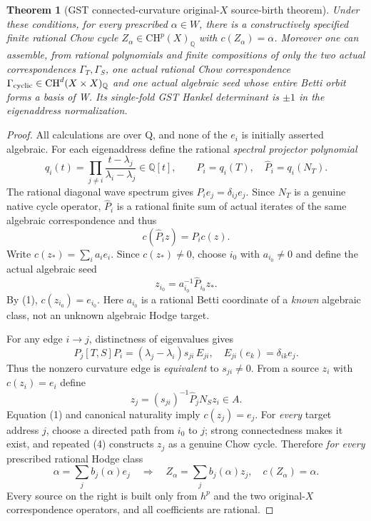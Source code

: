 \documentclass[11pt]{article}
\newtheorem{theorem}{Theorem}
\newcommand{\Q}{\mathbb Q}
\newcommand{\CH}{\mathrm{CH}}
\begin{document}
\begin{theorem}[GST connected-curvature original-$X$ source-birth theorem]
Under these conditions, for every prescribed $\alpha\in W$, there is a \emph{constructively specified finite} rational Chow cycle $Z_\alpha\in\CH^p(X)_\Q$ with $c(Z_\alpha)=\alpha$. Moreover one can assemble, from rational polynomials and finite compositions of only the two \emph{actual} correspondences $\Gamma_T,\Gamma_S$, one actual rational Chow correspondence $\Gamma_{\rm cyclic}\in\CH^d(X\times X)_\Q$ and one actual algebraic seed whose entire Betti orbit forms a basis of W. Its single-fold GST Hankel determinant is $\pm1$ in the eigenaddress normalization.
\end{theorem}
\begin{proof}
All calculations are over Q, and none of the $e_i$ is initially asserted algebraic. For each eigenaddress define the rational \emph{spectral projector polynomial}
\[
 q_i(t)=\prod_{j\ne i}\frac{t-\lambda_j}{\lambda_i-\lambda_j}\in\Q[t],
 \qquad P_i=q_i(T),\quad\widehat P_i=q_i(N_T).
\]
The rational diagonal wave spectrum gives $P_ie_j=\delta_{ij}e_j$. Since $N_T$ is a genuine native cycle operator, $\widehat P_i$ is a rational finite sum of actual iterates of the same algebraic correspondence and thus
\[
 \boxed{c(\widehat P_i z)=P_i c(z).}
 \tag{1}
\]
Write $c(z_*)=\sum_i a_ie_i$. Since $c(z_*)\ne0$, choose $i_0$ with $a_{i_0}\ne0$ and define the actual algebraic seed
\[
 \boxed{z_{i_0}=a_{i_0}^{-1}\widehat P_{i_0}z_*.}
 \tag{2}
\]
By (1), $c(z_{i_0})=e_{i_0}$. Here $a_{i_0}$ is a rational Betti coordinate of a \emph{known} algebraic class, not an unknown algebraic Hodge target.

For any edge $i\to j$, distinctness of eigenvalues gives
\[
 \boxed{P_j[T,S]P_i=(\lambda_j-\lambda_i)s_{ji}\,E_{ji},}
 \quad E_{ji}(e_k)=\delta_{ik}e_j.
 \tag{3}
\]
Thus the nonzero curvature edge is \emph{equivalent} to $s_{ji}\ne0$. From a source $z_i$ with $c(z_i)=e_i$ define
\[
 \boxed{z_j=(s_{ji})^{-1}\widehat P_j N_Sz_i\in A.}
 \tag{4}
\]
Equation (1) and canonical naturality imply $c(z_j)=e_j$. For \emph{every} target address $j$, choose a directed path from $i_0$ to $j$; strong connectedness makes it exist, and repeated (4) constructs $z_j$ as a genuine Chow cycle. Therefore \emph{for every} prescribed rational Hodge class
\[
 \alpha=\sum_j b_j(\alpha)e_j
 \quad\Longrightarrow\quad
 \boxed{Z_\alpha=\sum_j b_j(\alpha)z_j,\quad c(Z_\alpha)=\alpha.}
 \tag{5}
\]
Every source on the right is built only from $h^p$ and the two original-$X$ correspondence operators, and all coefficients are rational.


\end{proof}
\end{document}
